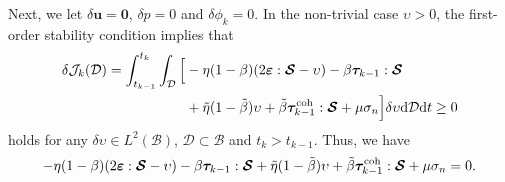 \documentclass{article}
\begin{document}
Next, we let $\delta\bm u = \bm 0$, $\delta p = 0$ and $\delta\phi_k = 0$. In the non-trivial case $\upsilon > 0$, the first-order stability condition implies that
\[
  \begin{aligned}
    \delta\mathcal J_k(\mathcal D) = \int_{t_{k-1}}^{t_k}\int_{\mathcal D}\Big[
    &-\eta(1-\beta)(2\bm\varepsilon : \bm{\mathcal S} - \upsilon) - \beta\bm\tau_{k-1} : \bm{\mathcal S} \\
    &+ \tilde\eta(1-\tilde\beta)\upsilon + \tilde\beta\bm\tau_{k-1}^{\rm coh} : \bm{\mathcal S} + \mu\sigma_n\Big]\delta\upsilon\mathrm d\mathcal D\mathrm dt \geq 0
  \end{aligned}
\]
holds for any $\delta\upsilon\in L^2(\mathcal B)$, $\mathcal D\subset\mathcal B$ and $t_k > t_{k-1}$. Thus, we have
\begin{equation}\label{eq:dJ deps c}
  -\eta(1-\beta)(2\bm\varepsilon : \bm{\mathcal S} - \upsilon) - \beta\bm\tau_{k-1} : \bm{\mathcal S} + \tilde\eta(1-\tilde\beta)\upsilon + \tilde\beta\bm\tau_{k-1}^{\rm coh} : \bm{\mathcal S} + \mu\sigma_n = 0.
\end{equation}
\end{document}
